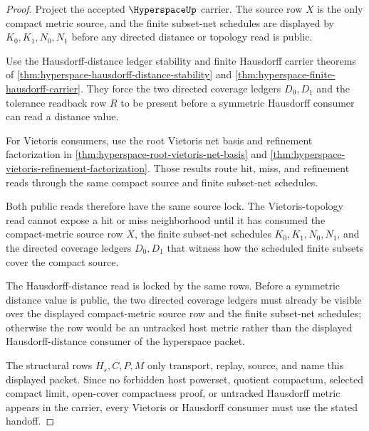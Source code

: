 \begin{proof}
Project the accepted $\HyperspaceUp$ carrier. The source row $X$ is the only compact metric source, and the finite subset-net schedules are displayed by $K_0,K_1,N_0,N_1$ before any directed distance or topology read is public.

Use the Hausdorff-distance ledger stability and finite Hausdorff carrier theorems of \autoref{thm:hyperspace-hausdorff-distance-stability} and \autoref{thm:hyperspace-finite-hausdorff-carrier}. They force the two directed coverage ledgers $D_0,D_1$ and the tolerance readback row $R$ to be present before a symmetric Hausdorff consumer can read a distance value.

For Vietoris consumers, use the root Vietoris net basis and refinement factorization in \autoref{thm:hyperspace-root-vietoris-net-basis} and \autoref{thm:hyperspace-vietoris-refinement-factorization}. Those results route hit, miss, and refinement reads through the same compact source and finite subset-net schedules.

Both public reads therefore have the same source lock. The Vietoris-topology read cannot expose a hit or miss neighborhood until it has consumed the compact-metric source row $X$, the finite subset-net schedules $K_0,K_1,N_0,N_1$, and the directed coverage ledgers $D_0,D_1$ that witness how the scheduled finite subsets cover the compact source.

The Hausdorff-distance read is locked by the same rows. Before a symmetric distance value is public, the two directed coverage ledgers must already be visible over the displayed compact-metric source row and the finite subset-net schedules; otherwise the row would be an untracked host metric rather than the displayed Hausdorff-distance consumer of the hyperspace packet.

The structural rows $H_s,C,P,M$ only transport, replay, source, and name this displayed packet. Since no forbidden host powerset, quotient compactum, selected compact limit, open-cover compactness proof, or untracked Hausdorff metric appears in the carrier, every Vietoris or Hausdorff consumer must use the stated handoff.
\end{proof}

